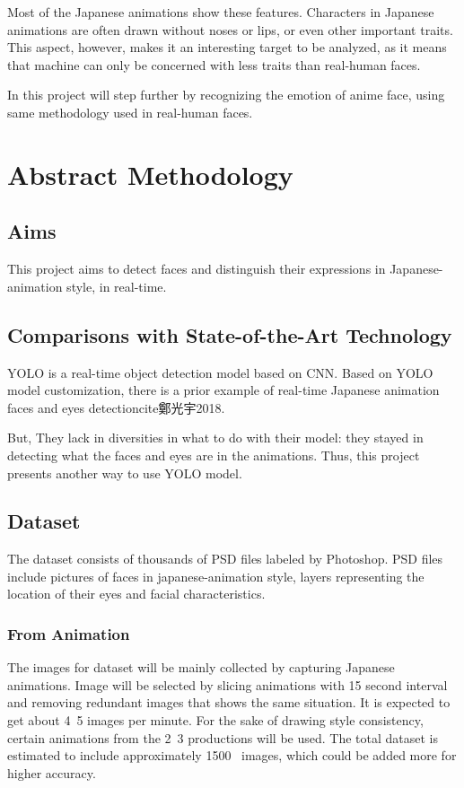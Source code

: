\documentclass{article}
\begin{document}
Most of the Japanese animations show these features. Characters in Japanese animations are often drawn without noses or lips, or even other important traits. This aspect, however, makes it an interesting target to be analyzed, as it means that machine can only be concerned with less traits than real-human faces.

In this project will step further by recognizing the emotion of anime face, using same methodology used in real-human faces.


\section{Abstract Methodology}

\subsection{Aims}

This project aims to detect faces and distinguish their expressions in Japanese-animation style, in real-time.

\subsection{Comparisons with State-of-the-Art Technology}

YOLO is a real-time object detection model based on CNN.
Based on YOLO model customization, there is a prior example of real-time Japanese animation faces and eyes detectioncite{鄭光宇2018}.

But, They lack in diversities in what to do with their model: they stayed in detecting what the faces and eyes are in the animations.
Thus, this project presents another way to use YOLO model.


\subsection{Dataset}

The dataset consists of thousands of PSD files labeled by Photoshop. PSD files include pictures of faces in japanese-animation style, layers representing the location of their eyes and facial characteristics.

\subsubsection{From Animation}
The images for dataset will be mainly collected by capturing Japanese animations.
Image will be selected by slicing animations with 15 second interval and removing redundant images that shows the same situation. It is expected to get about 4~5 images per minute.
For the sake of drawing style consistency, certain animations from the 2~3 productions will be used. The total dataset is estimated to include approximately 1500~ images, which could be added more for higher accuracy.
\end{document}
